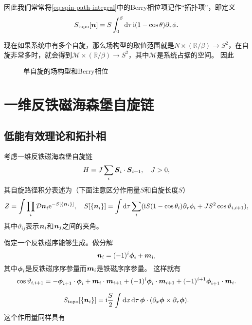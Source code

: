 因此我们常常将\eqref{eq:spin-path-integral}中的Berry相位项记作“拓扑项”，即定义
\begin{equation}
    S_\text{topo}[\vb*{n}] = S \int_0^\beta \dd{\tau} \mathrm{i} (1 - \cos \theta) \partial_\tau \phi.
\end{equation}

现在如果系统中有多个自旋，那么场构型的取值范围就是$N \times (\mathbb{R} / \beta) \to S^2$，在自旋非常多时，就会得到$\mathcal{M} \times (\mathbb{R} / \beta) \to S^2$，其中$\mathcal{M}$是系统占据的空间。
因此

\begin{figure}
    \centering
    \caption{单自旋的场构型和Berry相位}
\end{figure}

\section{一维反铁磁海森堡自旋链}

\subsection{低能有效理论和拓扑相}

考虑一维反铁磁海森堡自旋链
\begin{equation}
    H = J \sum_{i} \vb*{S}_i \cdot \vb*{S}_{i+1}, \quad J > 0,
\end{equation}
其自旋路径积分表述为（下面注意区分作用量$S$和自旋长度$S$）
\begin{equation}
    Z = \int \prod_i \mathcal{D} \vb*{n}_i \mathrm{e}^{-S[\{\vb*{n}_i\}]} , \quad S[\{\vb*{n}_i\}] = \int \dd{\tau} \sum_i ( \mathrm{i} S (1 - \cos \theta_i) \partial_\tau \phi_i + J S^2 \cos \vartheta_{i, i+1} ),
\end{equation}
其中$\vartheta_{ij}$表示$\vb*{n}_i$和$\vb*{n}_j$之间的夹角。

假定一个反铁磁序能够生成。做分解
\begin{equation}
    \vb*{n}_i = (-1)^i \vb*{\phi}_i + \vb*{m}_i,
\end{equation}
其中$\vb*{\phi}_i$是反铁磁序序参量而$\vb*{m}_i$是铁磁序序参量。
这样就有
\[
    \cos \vartheta_{i, i+1} = - \vb*{\phi}_{i+1} \cdot \vb*{\phi}_i + \vb*{m}_i \cdot \vb*{m}_{i+1} + (-1)^{i} \vb*{\phi}_i \cdot \vb*{m}_{i+1} + (-1)^{i+1} \vb*{\phi}_{i+1} \cdot \vb*{m}_i.
\]

\begin{equation}
    S_\text{topo}[\{\vb*{n}_i\}] = \mathrm{i} \frac{S}{2} \int \dd{x} \dd{\tau} \vb*{\phi} \cdot (\partial_x \vb*{\phi} \times \partial_\tau \vb*{\phi}).
\end{equation}
这个作用量同样具有
